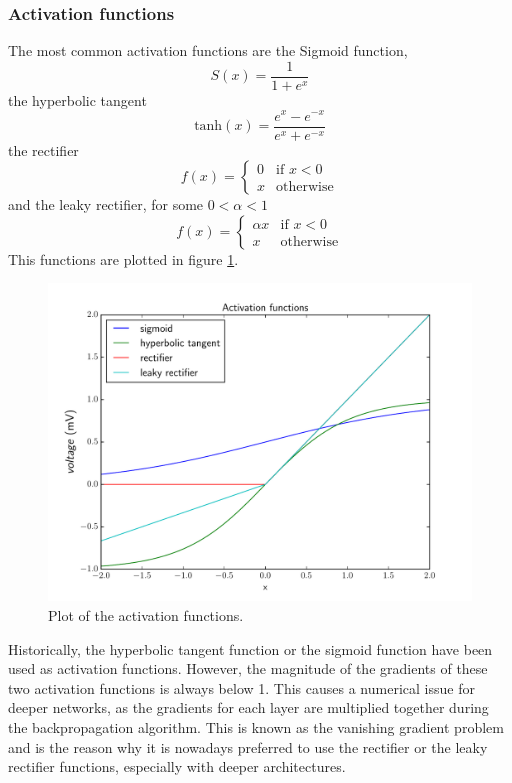 \documentclass[12pt,a4paper,twoside,openright]{report}
\begin{document}
\subsubsection{Activation functions}
The most common activation functions are the Sigmoid function,
\[S(x) = \frac{1}{1 + e^x}\] the hyperbolic tangent 
\[\textrm{tanh}(x)=\frac{e^x - e^{-x}}{e^x + e^{-x}}\] the rectifier 
\[
f(x) = 
\begin{cases}
	0 & \text{if } x < 0\\
	x & \text{otherwise}
\end{cases}
\]
and the leaky rectifier, for some $0 < \alpha < 1$
\[
f(x) = 
\begin{cases}
	\alpha x & \text{if } x < 0\\
	x & \text{otherwise}
\end{cases}
\]
This functions are plotted in figure \ref{fig:activation_functions}. 
\begin{figure}
	\centering
	\includegraphics[scale=0.6]{activations}
	\caption{Plot of the activation functions.}
	\label{fig:activation_functions}
\end{figure}
Historically, the hyperbolic tangent function or the sigmoid function have been used as activation functions. However, the magnitude of the gradients of these two activation functions is always below 1. This causes a numerical issue for deeper networks, as the gradients for each layer are multiplied together during the backpropagation algorithm. This is known as the vanishing gradient problem \cite{vanishing_gradients} and is the reason why it is nowadays preferred to use the rectifier or the leaky rectifier functions, especially with deeper architectures.
\end{document}
